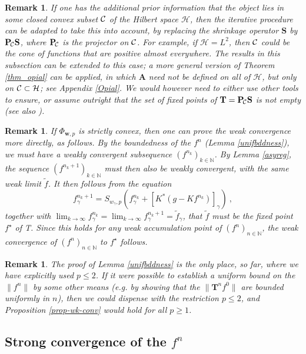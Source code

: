 \documentclass[10pt]{article}
\newtheorem{remark}[theorem]{Remark}
\def\N{\mathbb{N}}
\def\S{\mathbf{S}}
\def\T{\mathbf{T}}
\def\A{\mathbf{A}}
\def\cH{\mathcal{H}}
\def\K{K^*}
\def\wf{\widetilde{f}}
\def\ag{w_{\gamma}}
\def\g{\gamma}
\begin{document}
\begin{remark}
{\rm If one has the additional prior information that the object lies in
some closed convex subset ${\cal C}$ of the Hilbert space $\cH$, then the
iterative procedure can be adapted to take this into account, by replacing
the shrinkage operator
${\S}$  by ${\mathbf P}_{\!\cal C} {\S}$,
where ${\mathbf P}_{\!\cal C}$ is the projector on ${\cal C}$. For example,
if $\cH=L^2$, then ${\cal C}$ could be the cone of functions that are positive
almost everywhere. The  results in this subsection can be extended to this
case;
a more general version of Theorem \ref{thm_opial}
can be applied, in which $\A $ need not be defined
on all of $\cH$, but only on ${\cal C} \subset \cH$; see Appendix \ref{Opial}.
We would however need to either use other tools
to ensure, or assume outright
that the set of fixed points of $\T={\mathbf P}_{\!\cal C} {\S}$ is not empty
(see also  \cite{Eic92})}.
\end{remark}

\bigskip

\begin{remark}
{\rm If $\Phi_{\mathbf{w},p}$ is strictly convex, then one can prove the weak
convergence more directly, as follows. By the boundedness of the $f^n$
(Lemma \ref{unifbddness}), we must have a weakly convergent subsequence
$(f^{n_k})_{k \in \N}$. By Lemma \ref{asyreg}, the sequence
$(f^{n_k+1})_{k \in \N}$ must then also be weakly convergent, with the same
weak limit $\wf$. It then follows from the equation
$$
f^{n_k+1}_\g= S_{\ag,p}\left(f^{n_k}_\g +[\K (g-K f^{n_k})]_\g \right)~,
$$
together with $\lim_{k \to \infty}f^{n_k}_\g = \lim_{k \to \infty}f^{n_k+1}_\g
=\wf _\g$, that $\wf$ must be the fixed point $f^\star$ of T. Since this
holds for
any weak accumulation point of $(f^n)_{n \in \N}$, the weak convergence
of $(f^n)_{n \in \N}$ to $f^\star$ follows. }
\end{remark}

\bigskip

\begin{remark}
{\rm The proof of Lemma \ref{unifbddness} is the only place, so far, where we
have explicitly used $p \leq 2$. If it were possible to establish a uniform
bound on the $\|f^n\|$ by some other means (e.g. by showing that the
$\|\T^n f^0\|$
are bounded uniformly in $n$), then we could dispense with the restriction
$p \leq 2$, and Proposition \ref{prop-wk-conv} would hold for all $p \geq 1$. }
\end{remark}

\subsection{Strong convergence of the $f^n$}
\end{document}
